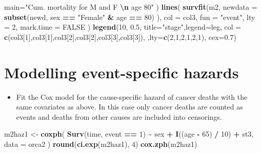 \documentclass[
]{book}
\newenvironment{Shaded}{\begin{snugshade}}{\end{snugshade}}
\newcommand{\AttributeTok}[1]{\textcolor[rgb]{0.13,0.29,0.53}{#1}}
\newcommand{\ConstantTok}[1]{\textcolor[rgb]{0.56,0.35,0.01}{#1}}
\newcommand{\DecValTok}[1]{\textcolor[rgb]{0.00,0.00,0.81}{#1}}
\newcommand{\FloatTok}[1]{\textcolor[rgb]{0.00,0.00,0.81}{#1}}
\newcommand{\FunctionTok}[1]{\textcolor[rgb]{0.13,0.29,0.53}{\textbf{#1}}}
\newcommand{\NormalTok}[1]{#1}
\newcommand{\OtherTok}[1]{\textcolor[rgb]{0.56,0.35,0.01}{#1}}
\newcommand{\SpecialCharTok}[1]{\textcolor[rgb]{0.81,0.36,0.00}{\textbf{#1}}}
\newcommand{\StringTok}[1]{\textcolor[rgb]{0.31,0.60,0.02}{#1}}
\providecommand{\tightlist}{%
  \setlength{\itemsep}{0pt}\setlength{\parskip}{0pt}}
\begin{document}
\begin{Shaded}
\begin{Highlighting}[]
   \AttributeTok{main=}\StringTok{"Cum. mortality for M and F }\SpecialCharTok{\textbackslash{}n}\StringTok{ age 80"}
\NormalTok{)}
\FunctionTok{lines}\NormalTok{(}
  \FunctionTok{survfit}\NormalTok{(m2, }\AttributeTok{newdata =} \FunctionTok{subset}\NormalTok{(newd, sex }\SpecialCharTok{==} \StringTok{"Female"} \SpecialCharTok{\&}\NormalTok{ age }\SpecialCharTok{==} \DecValTok{80}\NormalTok{)  ),}
  \AttributeTok{col =}\NormalTok{ col3, }\AttributeTok{fun =} \StringTok{"event"}\NormalTok{, }\AttributeTok{lty =} \DecValTok{2}\NormalTok{, }\AttributeTok{mark.time =} \ConstantTok{FALSE}
\NormalTok{)}
\FunctionTok{legend}\NormalTok{(}\DecValTok{10}\NormalTok{, }\FloatTok{0.5}\NormalTok{, }\AttributeTok{title=}\StringTok{"stage"}\NormalTok{,}\AttributeTok{legend=}\NormalTok{leg,}
       \AttributeTok{col =} \FunctionTok{c}\NormalTok{(col3[}\DecValTok{1}\NormalTok{],col3[}\DecValTok{1}\NormalTok{],col3[}\DecValTok{2}\NormalTok{],col3[}\DecValTok{2}\NormalTok{],col3[}\DecValTok{3}\NormalTok{],col3[}\DecValTok{3}\NormalTok{]),}
\NormalTok{        ,}\AttributeTok{lty=}\FunctionTok{c}\NormalTok{(}\DecValTok{2}\NormalTok{,}\DecValTok{1}\NormalTok{,}\DecValTok{2}\NormalTok{,}\DecValTok{1}\NormalTok{,}\DecValTok{2}\NormalTok{,}\DecValTok{1}\NormalTok{), }\AttributeTok{cex=}\FloatTok{0.7}\NormalTok{)}
\end{Highlighting}
\end{Shaded}

\section{Modelling event-specific hazards}\label{modelling-event-specific-hazards}

\begin{itemize}
\tightlist
\item
  Fit the Cox model for the cause-specific hazard of cancer deaths
  with the same covariates as above. In this case
  only cancer deaths are counted as events and deaths from other causes
  are included into censorings.
\end{itemize}

\begin{Shaded}
\begin{Highlighting}[]
\NormalTok{m2haz1 }\OtherTok{\textless{}{-}} 
  \FunctionTok{coxph}\NormalTok{(}
    \FunctionTok{Surv}\NormalTok{(time, event }\SpecialCharTok{==} \DecValTok{1}\NormalTok{) }\SpecialCharTok{\textasciitilde{}}\NormalTok{ sex }\SpecialCharTok{+} \FunctionTok{I}\NormalTok{((age }\SpecialCharTok{{-}} \DecValTok{65}\NormalTok{) }\SpecialCharTok{/} \DecValTok{10}\NormalTok{) }\SpecialCharTok{+}\NormalTok{ st3, }
    \AttributeTok{data =}\NormalTok{ orca2}
\NormalTok{  )}
\FunctionTok{round}\NormalTok{(}\FunctionTok{ci.exp}\NormalTok{(m2haz1), }\DecValTok{4}\NormalTok{)}
\FunctionTok{cox.zph}\NormalTok{(m2haz1)}
\end{Highlighting}
\end{Shaded}
\end{document}

